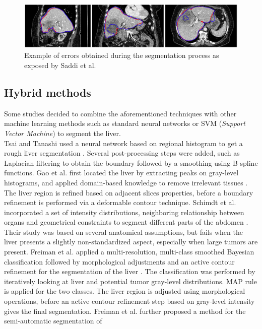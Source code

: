 \documentclass[]{article}
\begin{document}
	\begin{figure}[th!]
		\centering
		\includegraphics[width=0.7\linewidth]{images/image21}
		\caption{Example of errors obtained during the segmentation process as exposed by Saddi et al. \cite{Saddi2007}}
		\label{Saddi2007_Fig}
	\end{figure}
	
	\subsection*{Hybrid methods}
	
	Some studies decided to combine the aforementioned techniques with other
	machine learning methods such as standard neural networks or SVM
	(\emph{Support Vector Machine}) to segment the liver.\\
	Tsai and Tanashi used a neural network based on regional histogram to get
	a rough liver segmentation \cite{Tsai1994}. Several post-processing steps were added,
	such as Laplacian filtering to obtain the boundary followed by a
	smoothing using B-spline functions.
	Gao et al. first located the liver by extracting peaks on gray-level
	histograms, and applied domain-based knowledge to remove irrelevant
	tissues \cite{Gao1996}. The liver region is refined based on adjacent slices
	properties, before a boundary refinement is performed via a deformable
	contour technique.
	Schimdt et al. incorporated a set of intensity distributions,
	neighboring relationship between organs and geometrical constraints to
	segment different parts of the abdomen \cite{Schmidt2007}. Their study was based on several
	anatomical assumptions, but fails when the liver presents a slightly
	non-standardized aspect, especially when large tumors are present.
	Freiman et al. applied a multi-resolution, multi-class smoothed Bayesian
	classification followed by morphological adjustments and an active
	contour refinement for the segmentation of the liver \cite{Freiman2008}. The classification
	was performed by iteratively looking at liver and potential tumor
	gray-level distributions. MAP rule is applied for the two classes. The
	liver region is adjusted using morphological operations, before an
	active contour refinement step based on gray-level intensity gives the
	final segmentation.
	Freiman et al. further proposed a method for the semi-automatic segmentation of
\end{document}
